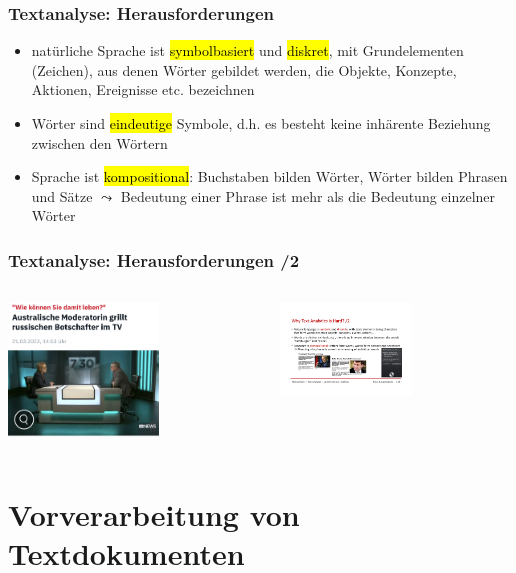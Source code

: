 \begin{frame}
    \frametitle{Textanalyse: Herausforderungen}

    \begin{itemize}
        \item natürliche Sprache ist \hl{symbolbasiert} und \hl{diskret}, mit Grundelementen (Zeichen), aus denen Wörter gebildet werden, die Objekte, Konzepte, Aktionen, Ereignisse etc. bezeichnen
        \item Wörter sind \hl{eindeutige} Symbole, d.h. es besteht keine inhärente Beziehung zwischen den Wörtern
        \item Sprache ist \hl{kompositional}: Buchstaben bilden Wörter, Wörter bilden Phrasen und Sätze
        $\leadsto$ Bedeutung einer Phrase ist mehr als die Bedeutung einzelner Wörter
    \end{itemize}
   

\end{frame}
\begin{frame}
    \frametitle{Textanalyse: Herausforderungen /2}

    \begin{columns}[c]
        \begin{column}{4cm}
    \includegraphics[width=4cm]{fig8/ntv.png}
        \end{column}
        \begin{column}{4cm}
    \includegraphics[width=3.5cm]{fig8/siri.pdf}
        \end{column}
    \end{columns}

\end{frame}

\section{Vorverarbeitung von Textdokumenten}

